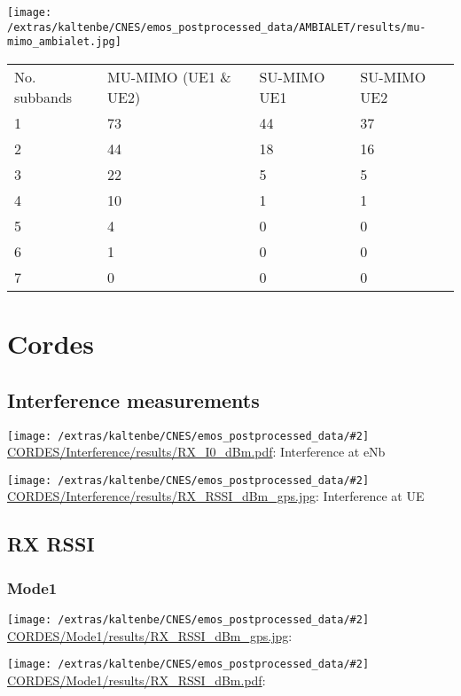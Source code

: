 \documentclass[a4paper,10pt]{article}
\newcommand{\printfile}[2][]{
 \begin{minipage}{8cm}
  \centering
  \texttt{[image: /extras/kaltenbe/CNES/emos\_postprocessed\_data/\#2]}
  \url{#2}: #1

 \end{minipage}
}
\begin{document}
\begin{minipage}{16cm}
  \centering
  \texttt{[image: /extras/kaltenbe/CNES/emos\_postprocessed\_data/AMBIALET/results/mu-mimo\_ambialet.jpg]}
  
\begin{tabular}{llll}
No. subbands & MU-MIMO (UE1 \& UE2) & SU-MIMO UE1 & SU-MIMO UE2 \\ 
1 & 73 & 44 & 37 \\ 
2 & 44 & 18 & 16 \\ 
3 & 22 & 5 & 5 \\ 
4 & 10 & 1 & 1 \\ 
5 & 4 & 0 & 0 \\ 
6 & 1 & 0 & 0 \\ 
7 & 0 & 0 & 0
\end{tabular}
\end{minipage}


\section{Cordes}
\label{sec:cordes}

\subsection{Interference measurements}

\printfile[Interference at eNb]{CORDES/Interference/results/RX_I0_dBm.pdf}
\printfile[Interference at UE]{CORDES/Interference/results/RX_RSSI_dBm_gps.jpg}


\subsection{RX RSSI}


%  

\subsubsection{Mode1}
\printfile{CORDES/Mode1/results/RX_RSSI_dBm_gps.jpg}
\printfile{CORDES/Mode1/results/RX_RSSI_dBm.pdf}
\end{document}
